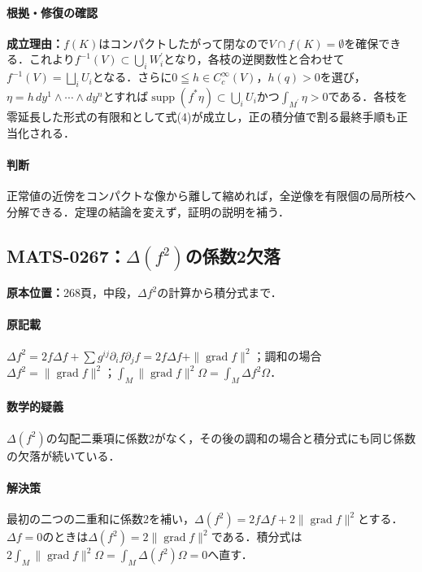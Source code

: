 \documentclass[a4paper,10pt]{ltjsarticle}
\begin{document}
\paragraph{根拠・修復の確認}\textbf{成立理由：}$f(K)$はコンパクトしたがって閉なので$V\cap f(K)=\emptyset$を確保できる．これより$f^{-1}(V)\subset\bigcup_iW_i^{\prime}$となり，各枝の逆関数性と合わせて$f^{-1}(V)=\bigsqcup_iU_i$となる．さらに$0\leqq h\in C_c^\infty(V)$，$h(q)>0$を選び，$\eta=h\,dy^1\wedge\cdots\wedge dy^n$とすれば$\operatorname{supp}(f^*\eta)\subset\bigcup_iU_i$かつ$\int_{M^{\prime}}\eta>0$である．各枝を零延長した形式の有限和として式(4)が成立し，正の積分値で割る最終手順も正当化される．

\paragraph{判断}正常値の近傍をコンパクトな像から離して縮めれば，全逆像を有限個の局所枝へ分解できる．定理の結論を変えず，証明の説明を補う．


\subsection*{MATS-0267：$\Delta(f^2)$の係数2欠落}\label{math:MATS-0267}
\noindent\textbf{原本位置：}268頁，中段，$\Delta f^2$の計算から積分式まで．

\paragraph{原記載}$\Delta f^2=2f\Delta f+\sum g^{ij}\partial_i f\partial_j f=2f\Delta f+\|\operatorname{grad}f\|^2$；調和の場合$\Delta f^2=\|\operatorname{grad}f\|^2$；$\int_M\|\operatorname{grad}f\|^2\Omega=\int_M\Delta f^2\Omega$．

\paragraph{数学的疑義}$\Delta(f^2)$の勾配二乗項に係数2がなく，その後の調和の場合と積分式にも同じ係数の欠落が続いている．

\paragraph{解決策}最初の二つの二重和に係数2を補い，$\Delta(f^2)=2f\Delta f+2\|\operatorname{grad}f\|^2$とする．$\Delta f=0$のときは$\Delta(f^2)=2\|\operatorname{grad}f\|^2$である．積分式は$2\int_M\|\operatorname{grad}f\|^2\Omega=\int_M\Delta(f^2)\Omega=0$へ直す．
\end{document}
